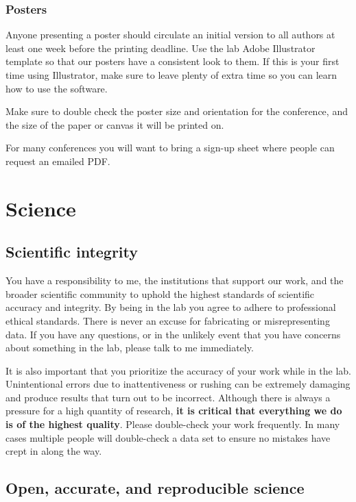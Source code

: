 \documentclass[letterpaper,12pt,oneside]{memoir}
\begin{document}
\subsection{Posters}
Anyone presenting a poster should circulate an initial version to all authors at least one week before the printing deadline. Use the lab Adobe Illustrator template so that our posters have a consistent look to them. If this is your first time using Illustrator, make sure to leave plenty of extra time so you can learn how to use the software.

Make sure to double check the poster size and orientation for the conference, and the size of the paper or canvas it will be printed on.

For many conferences you will want to bring a sign-up sheet where people can request an emailed PDF.



\chapter{Science}

\section{Scientific integrity}

You have a responsibility to me, the institutions that support our work, and the broader scientific community to uphold the highest standards of scientific accuracy and integrity. By being in the lab you agree to adhere to professional ethical standards. There is never an excuse for fabricating or misrepresenting data. If you have any questions, or in the unlikely event that you have concerns about something in the lab, please talk to me immediately.

It is also important that you prioritize the accuracy of your work while in the lab. Unintentional errors due to inattentiveness or rushing can be extremely damaging and produce results that turn out to be incorrect. Although there is always a pressure for a high quantity of research, \textbf{it is critical that everything we do is of the highest quality}. Please double-check your work frequently. In many cases multiple people will double-check a data set to ensure no mistakes have crept in along the way.


\section{Open, accurate, and reproducible science}
\label{sec:openscience}
\end{document}
